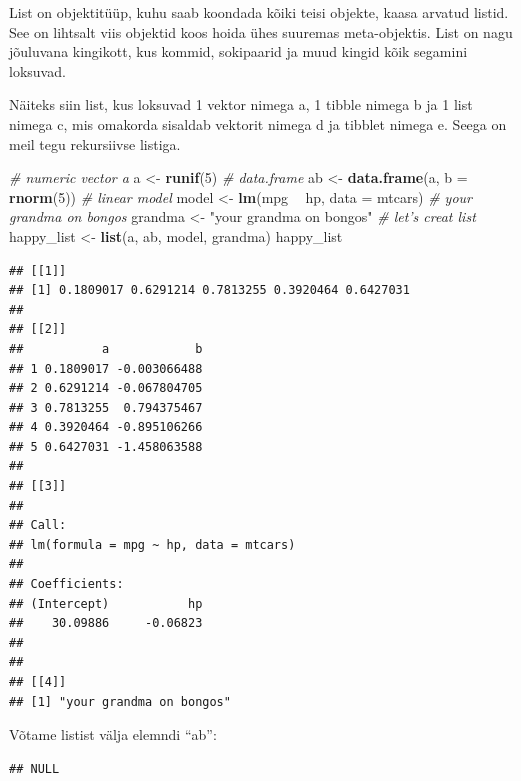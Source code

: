\documentclass[]{book}
\newenvironment{Shaded}{\begin{snugshade}}{\end{snugshade}}
\newcommand{\KeywordTok}[1]{\textcolor[rgb]{0.13,0.29,0.53}{\textbf{#1}}}
\newcommand{\DataTypeTok}[1]{\textcolor[rgb]{0.13,0.29,0.53}{#1}}
\newcommand{\DecValTok}[1]{\textcolor[rgb]{0.00,0.00,0.81}{#1}}
\newcommand{\StringTok}[1]{\textcolor[rgb]{0.31,0.60,0.02}{#1}}
\newcommand{\CommentTok}[1]{\textcolor[rgb]{0.56,0.35,0.01}{\textit{#1}}}
\newcommand{\OperatorTok}[1]{\textcolor[rgb]{0.81,0.36,0.00}{\textbf{#1}}}
\newcommand{\NormalTok}[1]{#1}
\begin{document}
List on objektitüüp, kuhu saab koondada kõiki teisi objekte, kaasa
arvatud listid. See on lihtsalt viis objektid koos hoida ühes suuremas
meta-objektis. List on nagu jõuluvana kingikott, kus kommid, sokipaarid
ja muud kingid kõik segamini loksuvad.

Näiteks siin list, kus loksuvad 1 vektor nimega a, 1 tibble nimega b ja
1 list nimega c, mis omakorda sisaldab vektorit nimega d ja tibblet
nimega e. Seega on meil tegu rekursiivse listiga.

\begin{Shaded}
\begin{Highlighting}[]
\CommentTok{# numeric vector a}
\NormalTok{a <-}\StringTok{ }\KeywordTok{runif}\NormalTok{(}\DecValTok{5}\NormalTok{)}
\CommentTok{# data.frame}
\NormalTok{ab <-}\StringTok{ }\KeywordTok{data.frame}\NormalTok{(a, }\DataTypeTok{b =} \KeywordTok{rnorm}\NormalTok{(}\DecValTok{5}\NormalTok{))}
\CommentTok{# linear model}
\NormalTok{model <-}\StringTok{ }\KeywordTok{lm}\NormalTok{(mpg }\OperatorTok{~}\StringTok{ }\NormalTok{hp, }\DataTypeTok{data =}\NormalTok{ mtcars)}
\CommentTok{# your grandma on bongos}
\NormalTok{grandma <-}\StringTok{ "your grandma on bongos"}
\CommentTok{# let's creat list}
\NormalTok{happy_list <-}\StringTok{ }\KeywordTok{list}\NormalTok{(a, ab, model, grandma)}
\NormalTok{happy_list}
\end{Highlighting}
\end{Shaded}

\begin{verbatim}
## [[1]]
## [1] 0.1809017 0.6291214 0.7813255 0.3920464 0.6427031
## 
## [[2]]
##           a            b
## 1 0.1809017 -0.003066488
## 2 0.6291214 -0.067804705
## 3 0.7813255  0.794375467
## 4 0.3920464 -0.895106266
## 5 0.6427031 -1.458063588
## 
## [[3]]
## 
## Call:
## lm(formula = mpg ~ hp, data = mtcars)
## 
## Coefficients:
## (Intercept)           hp  
##    30.09886     -0.06823  
## 
## 
## [[4]]
## [1] "your grandma on bongos"
\end{verbatim}

Võtame listist välja elemndi ``ab'':

\begin{Shaded}
\end{Shaded}

\begin{verbatim}
## NULL
\end{verbatim}
\end{document}

